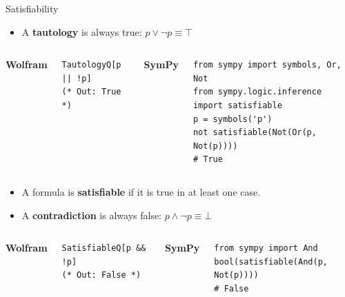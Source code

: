 \documentclass[aspectratio=169]{beamer}
\newcommand{\codelabel}[1]{\textbf{\footnotesize\color{dmDarkBlue}#1}\par\smallskip}
\begin{document}
\begin{frame}[fragile]{Satisfiability}
  \begin{itemize}
    \item A \textbf{tautology} is always true:
          $p \lor \lnot p \equiv \top$
  \end{itemize}
  \begin{columns}[T]
      \codelabel{Wolfram}
\begin{lstlisting}[style=wolfram]
TautologyQ[p || !p]
(* Out: True *)
\end{lstlisting}
      \codelabel{SymPy}
\begin{lstlisting}[style=python]
from sympy import symbols, Or, Not
from sympy.logic.inference import satisfiable
p = symbols('p')
not satisfiable(Not(Or(p, Not(p))))
# True
\end{lstlisting}
  \end{columns}

  \medskip
  \begin{itemize}
    \item A formula is \textbf{satisfiable} if it is true in at least one case.
    \item A \textbf{contradiction} is always false:
          $p \land \lnot p \equiv \bot$
  \end{itemize}
  \begin{columns}[T]
      \codelabel{Wolfram}
\begin{lstlisting}[style=wolfram]
SatisfiableQ[p && !p]
(* Out: False *)
\end{lstlisting}
      \codelabel{SymPy}
\begin{lstlisting}[style=python]
from sympy import And
bool(satisfiable(And(p, Not(p))))
# False
\end{lstlisting}
  \end{columns}
\end{frame}
\end{document}
